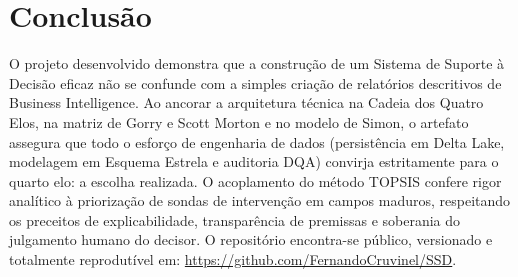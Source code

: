 \documentclass[12pt,a4paper]{article}
\begin{document}
\section{Conclusão}

O projeto desenvolvido demonstra que a construção de um Sistema de Suporte à Decisão eficaz não se confunde com a simples criação de relatórios descritivos de Business Intelligence. Ao ancorar a arquitetura técnica na Cadeia dos Quatro Elos, na matriz de Gorry e Scott Morton e no modelo de Simon, o artefato assegura que todo o esforço de engenharia de dados (persistência em Delta Lake, modelagem em Esquema Estrela e auditoria DQA) convirja estritamente para o quarto elo: a escolha realizada. O acoplamento do método TOPSIS confere rigor analítico à priorização de sondas de intervenção em campos maduros, respeitando os preceitos de explicabilidade, transparência de premissas e soberania do julgamento humano do decisor. O repositório encontra-se público, versionado e totalmente reprodutível em: \url{https://github.com/FernandoCruvinel/SSD}.
\end{document}
